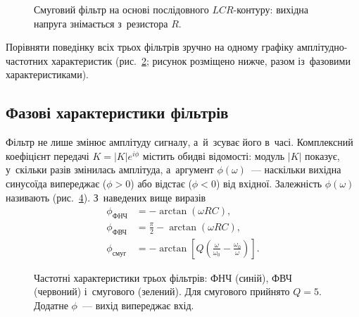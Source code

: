 \begin{figure}[h!]
	\centering
	\caption{Смуговий фільтр на основі послідовного $LCR$-контуру: вихідна напруга знімається з~резистора $R$.}
	\label{tikz:bandpass}
\end{figure}

Порівняти поведінку всіх трьох фільтрів зручно на одному графіку амплітудно-частотних характеристик (рис.~\ref{tikz:filter_responses}; рисунок розміщено нижче, разом із~фазовими характеристиками).

\subsection*{Фазові характеристики фільтрів}

Фільтр не лише змінює амплітуду сигналу, а~й~зсуває його в~часі. Комплексний коефіцієнт передачі $K = |K|e^{i\phi}$ містить обидві відомості: модуль $|K|$ показує, у~скільки разів змінилась амплітуда, а~аргумент $\phi(\omega)$~--- наскільки вихідна синусоїда випереджає ($\phi>0$) або відстає ($\phi<0$) від вхідної. Залежність $\phi(\omega)$ називають  (рис.~\ref{tikz:filter_phase}). З~наведених вище виразів
\begin{align*}
	\phi_{\text{ФНЧ}} &= -\arctan(\omega RC), \\
	\phi_{\text{ФВЧ}} &= \frac{\pi}{2} - \arctan(\omega RC), \\
	\phi_{\text{смуг}} &= -\arctan\left[Q\left(\frac{\omega}{\omega_0} - \frac{\omega_0}{\omega}\right)\right].
\end{align*}

\begin{figure}[h!]
	\centering
	\begin{subfigure}[t]{0.48\linewidth}
		\centering
		\label{tikz:filter_responses}
	\end{subfigure}\hfill
	\begin{subfigure}[t]{0.48\linewidth}
		\centering
		\label{tikz:filter_phase}
	\end{subfigure}
	\caption{Частотні характеристики трьох фільтрів: ФНЧ (синій), ФВЧ (червоний) і~смугового (зелений). Для смугового прийнято $Q = 5$. Додатне $\phi$~--- вихід випереджає вхід.}
\end{figure}

